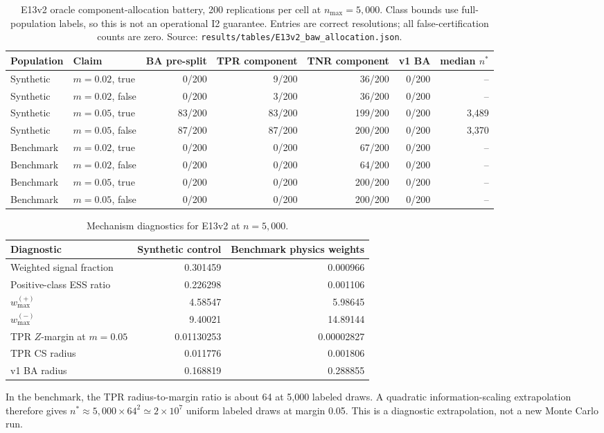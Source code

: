 \documentclass[11pt,a4paper]{article}
\begin{document}
\begin{table}[H]
\centering
\footnotesize
\caption{E13v2 oracle component-allocation battery, 200 replications per cell at $n_{\max}=5{,}000$. Class bounds use full-population labels, so this is not an operational I2 guarantee. Entries are correct resolutions; all false-certification counts are zero. Source: \texttt{results/tables/E13v2\_baw\_allocation.json}.}
\label{tab:e13v2}
\begin{tabular}{llrrrrr}
\toprule
Population & Claim & BA pre-split & TPR component & TNR component & v1 BA & median $n^*$ \\
\midrule
Synthetic & $m=0.02$, true & 0/200 & 9/200 & 36/200 & 0/200 & -- \\
Synthetic & $m=0.02$, false & 0/200 & 3/200 & 36/200 & 0/200 & -- \\
Synthetic & $m=0.05$, true & 83/200 & 83/200 & 199/200 & 0/200 & 3,489 \\
Synthetic & $m=0.05$, false & 87/200 & 87/200 & 200/200 & 0/200 & 3,370 \\
Benchmark & $m=0.02$, true & 0/200 & 0/200 & 67/200 & 0/200 & -- \\
Benchmark & $m=0.02$, false & 0/200 & 0/200 & 64/200 & 0/200 & -- \\
Benchmark & $m=0.05$, true & 0/200 & 0/200 & 200/200 & 0/200 & -- \\
Benchmark & $m=0.05$, false & 0/200 & 0/200 & 200/200 & 0/200 & -- \\
\bottomrule
\end{tabular}
\end{table}

\begin{table}[H]
\centering
\small
\caption{Mechanism diagnostics for E13v2 at $n=5{,}000$.}
\label{tab:e13diag}
\begin{tabular}{lrr}
\toprule
Diagnostic & Synthetic control & Benchmark physics weights \\
\midrule
Weighted signal fraction & 0.301459 & 0.000966 \\
Positive-class ESS ratio & 0.226298 & 0.001106 \\
$w_{\max}^{(+)}$ & 4.58547 & 5.98645 \\
$w_{\max}^{(-)}$ & 9.40021 & 14.89144 \\
TPR $Z$-margin at $m=0.05$ & 0.01130253 & 0.00002827 \\
TPR CS radius & 0.011776 & 0.001806 \\
v1 BA radius & 0.168819 & 0.288855 \\
\bottomrule
\end{tabular}

\vspace{0.5em}
\parbox{0.92\linewidth}{\footnotesize In the benchmark, the TPR radius-to-margin
ratio is about 64 at 5,000 labeled draws. A quadratic information-scaling
extrapolation therefore gives $n^*\approx 5{,}000\times64^2\simeq2\times10^7$
uniform labeled draws at margin 0.05. This is a diagnostic extrapolation, not a
new Monte Carlo run.}
\end{table}
\FloatBarrier
\end{document}
